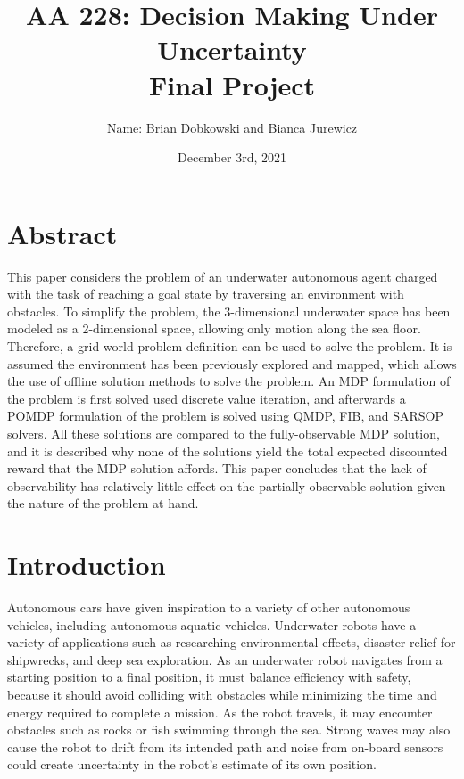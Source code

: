 \documentclass{article}
\title{AA 228: Decision Making Under Uncertainty \\ Final Project}
\author{Name: Brian Dobkowski and Bianca Jurewicz}
\date{December 3rd, 2021}
\begin{document}
\maketitle
\pagestyle{fancy} 

\section*{Abstract}
This paper considers the problem of an underwater autonomous agent charged with the task of reaching a goal state by traversing an environment with obstacles. To simplify the problem, the 3-dimensional underwater space has been modeled as a 2-dimensional space, allowing only motion along the sea floor. Therefore, a grid-world problem definition can be used to solve the problem.  It is assumed the environment has been previously explored and mapped, which allows the use of offline solution methods to solve the problem. An MDP formulation of the problem is first solved used discrete value iteration, and afterwards a POMDP formulation of the problem is solved using QMDP, FIB, and SARSOP solvers.  All these solutions are compared to the fully-observable MDP solution, and it is described why none of the solutions yield the total expected discounted reward that the MDP solution affords. This paper concludes that the lack of observability has relatively little effect on the partially observable solution given the nature of the problem at hand.


\section*{Introduction}
Autonomous cars have given inspiration to a variety of other autonomous vehicles, including autonomous aquatic vehicles.  Underwater robots have a variety of applications such as researching environmental effects, disaster relief for shipwrecks, and deep sea exploration.  As an underwater robot navigates from a starting position to a final position, it must balance efficiency with safety, because it should avoid colliding with obstacles while minimizing the time and energy required to complete a mission. As the robot travels, it may encounter obstacles such as rocks or fish swimming through the sea.  Strong waves may also cause the robot to drift from its intended path and noise from on-board sensors could create uncertainty in the robot's estimate of its own position.
\end{document}
